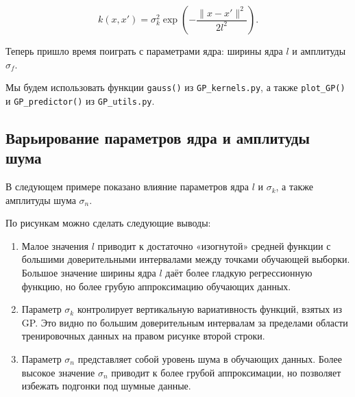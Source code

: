 \documentclass[11pt,a4paper]{article}
\providecommand{\tightlist}{%
      \setlength{\itemsep}{0pt}\setlength{\parskip}{0pt}}
\begin{document}
\[
  k(x, x') = \sigma_k^2 \exp{ \left( -\frac{\lVert x - x' \rVert^2}{2l^2} \right) }.
\]

Теперь пришло время поиграть с параметрами ядра: ширины ядра \(l\) и
амплитуды \(\sigma_f\).

Мы будем использовать функции \texttt{gauss()} из
\texttt{GP\_kernels.py}, а также \texttt{plot\_GP()} и
\texttt{GP\_predictor()} из \texttt{GP\_utils.py}.

    \hypertarget{ux432ux430ux440ux44cux438ux440ux43eux432ux430ux43dux438ux435-ux43fux430ux440ux430ux43cux435ux442ux440ux43eux432-ux44fux434ux440ux430-ux438-ux430ux43cux43fux43bux438ux442ux443ux434ux44b-ux448ux443ux43cux430}{%
\subsection{Варьирование параметров ядра и амплитуды
шума}\label{ux432ux430ux440ux44cux438ux440ux43eux432ux430ux43dux438ux435-ux43fux430ux440ux430ux43cux435ux442ux440ux43eux432-ux44fux434ux440ux430-ux438-ux430ux43cux43fux43bux438ux442ux443ux434ux44b-ux448ux443ux43cux430}}

В следующем примере показано влияние параметров ядра \(l\) и
\(\sigma_k\), а также амплитуды шума \(\sigma_n\).

\begin{center}
\end{center}

По рисункам можно сделать следующие выводы:

\begin{enumerate}
\def\labelenumi{\arabic{enumi}.}
\tightlist
\item
  Малое значения \(l\) приводит к достаточно «изогнутой» средней функции
  с большими доверительными интервалами между точками обучающей выборки.
  Большое значение ширины ядра \(l\) даёт более гладкую регрессионную
  функцию, но более грубую аппроксимацию обучающих данных.
\item
  Параметр \(\sigma_k\) контролирует вертикальную вариативность функций,
  взятых из GP. Это видно по большим доверительным интервалам за
  пределами области тренировочных данных на правом рисунке второй
  строки.
\item
  Параметр \(\sigma_n\) представляет собой уровень шума в обучающих
  данных. Более высокое значение \(\sigma_n\) приводит к более грубой
  аппроксимации, но позволяет избежать подгонки под шумные данные.
\end{enumerate}
\end{document}
